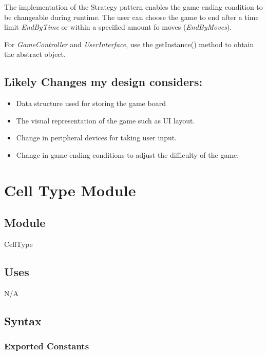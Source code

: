 \documentclass[12pt]{article}
\begin{document}
\medskip

The implementation of the Strategy pattern enables the game ending condition to be changeable during
runtime. The user can choose the game to end after
a time limit \textit{EndByTime} or within a specified amount fo moves (\textit{EndByMoves}).

\medskip

For \textit{GameController} and \textit{UserInterface}, use the getInstance() method to obtain the abstract object.

\newpage

\subsection*{Likely Changes my design considers:}

\begin{itemize}
  \item Data structure used for storing the game board
  \item The visual representation of the game such as UI layout. 
  \item Change in peripheral devices for taking user input. 
  \item Change in game ending conditions to adjust the difficulty of the game.
\end{itemize}

\newpage

\section* {Cell Type Module}

\subsection*{Module}

CellType

\subsection* {Uses}

N/A

\subsection* {Syntax}

\subsubsection* {Exported Constants}
\end{document}
